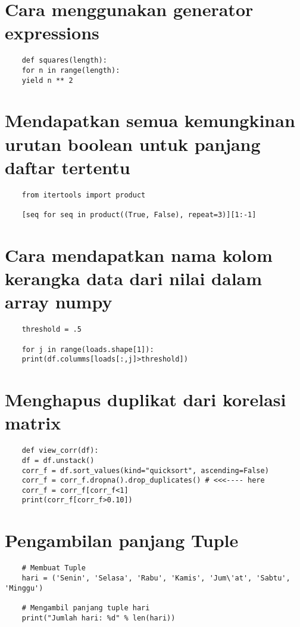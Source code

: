 \documentclass[12pt]{article} %
\begin{document}
\section{Cara menggunakan generator expressions}
\begin{lstlisting}
	def squares(length):
	for n in range(length):
	yield n ** 2
\end{lstlisting}

\section{Mendapatkan semua kemungkinan urutan boolean untuk panjang daftar tertentu}
\begin{lstlisting}
	from itertools import product
	
	[seq for seq in product((True, False), repeat=3)][1:-1]
\end{lstlisting}

\section{Cara mendapatkan nama kolom kerangka data dari nilai dalam array numpy}
\begin{lstlisting}
	threshold = .5
	
	for j in range(loads.shape[1]):
	print(df.columms[loads[:,j]>threshold])
\end{lstlisting}

\section{Menghapus duplikat dari korelasi matrix}
\begin{lstlisting}
	def view_corr(df):
	df = df.unstack()
	corr_f = df.sort_values(kind="quicksort", ascending=False)
	corr_f = corr_f.dropna().drop_duplicates() # <<<---- here
	corr_f = corr_f[corr_f<1]
	print(corr_f[corr_f>0.10])
\end{lstlisting}

\section{Pengambilan panjang Tuple}
\begin{lstlisting}
	# Membuat Tuple
	hari = ('Senin', 'Selasa', 'Rabu', 'Kamis', 'Jum\'at', 'Sabtu', 'Minggu')
	
	# Mengambil panjang tuple hari
	print("Jumlah hari: %d" % len(hari))
\end{lstlisting}
\end{document}

